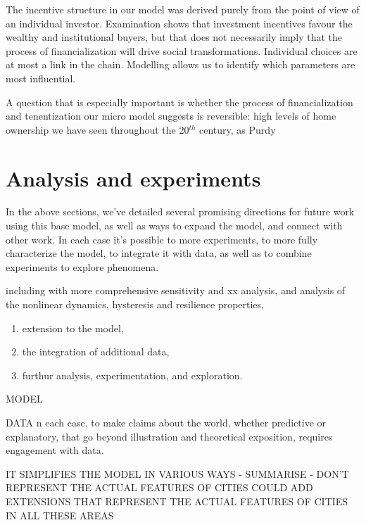 The incentive structure in our model was derived purely from the point of view of an individual investor. Examination shows that investment incentives favour the wealthy and institutional buyers, but that does not necessarily imply that the process of financialization will drive social transformations. Individual choices are at most  a link in the chain. Modelling  allows us to identify which parameters are most influential. 

A question that is especially important is whether the process of financialization and tenentization our micro model suggests is reversible:  high levels of home ownership we have seen throughout the 20$^{th}$ century, as Purdy 

\section{Analysis and experiments}

In the above sections, we've detailed several promising directions for future work using this base model, as well as ways to expand the model, and connect with other work. In each case it's possible to more experiments, to more fully characterize the model, to integrate it with data, as well as to combine experiments to explore phenomena. 





including with more comprehensive sensitivity and xx analysis, and analysis of the nonlinear dynamics, hysteresis and resilience properties, 



\begin{enumerate}
    \item extension to the model, 
    \item the integration of additional data, 
    \item furthur analysis, experimentation, and exploration.
\end{enumerate}

MODEL

DATA
n each case, to make claims about the world, whether predictive or explanatory, that go beyond illustration and 
theoretical exposition, requires engagement with data.  %

IT SIMPLIFIES THE MODEL IN VARIOUS WAYS - SUMMARISE - DON'T REPRESENT THE ACTUAL FEATURES OF CITIES COULD ADD EXTENSIONS THAT REPRESENT THE ACTUAL FEATURES OF CITIES IN ALL THESE AREAS



